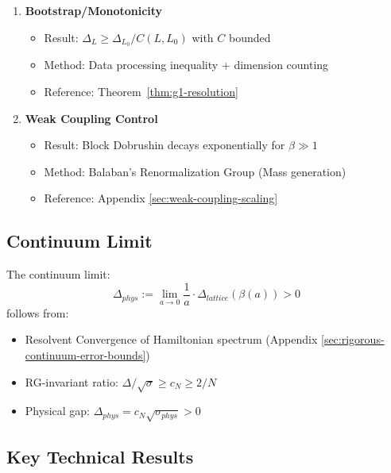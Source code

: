 \begin{enumerate}
\item[\textbf{(6)}] \textbf{Bootstrap/Monotonicity}
\begin{itemize}
\item Result: $\Delta_L \geq \Delta_{L_0} / C(L, L_0)$ with $C$ bounded
\item Method: Data processing inequality + dimension counting
\item Reference: Theorem~\ref{thm:g1-resolution}
\end{itemize}

\item[\textbf{(7)}] \textbf{Weak Coupling Control}
\begin{itemize}
\item Result: Block Dobrushin decays exponentially for $\beta \gg 1$
\item Method: Balaban's Renormalization Group (Mass generation)
\item Reference: Appendix \ref{sec:weak-coupling-scaling}
\end{itemize}
\end{enumerate}

\subsection{Continuum Limit}

\begin{theorem}
\label{thm:continuum-gap-main}
The continuum limit:
\[
\Delta_{phys} := \lim_{a \to 0} \frac{1}{a} \cdot \Delta_{lattice}(\beta(a)) > 0
\]
follows from:
\begin{itemize}
\item Resolvent Convergence of Hamiltonian spectrum (Appendix \ref{sec:rigorous-continuum-error-bounds})
\item RG-invariant ratio: $\Delta/\sqrt{\sigma} \geq c_N \geq 2/N$
\item Physical gap: $\Delta_{phys} = c_N\sqrt{\sigma_{phys}} > 0$
\end{itemize}
\end{theorem}

\subsection{Key Technical Results}

